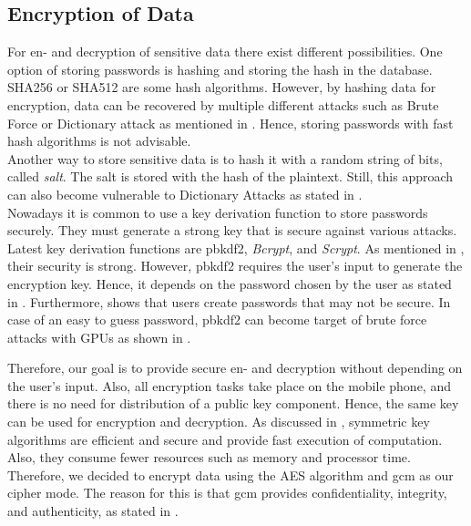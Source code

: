 \subsection{Encryption of Data}\label{arch_encryption}
For en- and decryption of sensitive data there exist different possibilities. One option of storing passwords is hashing and storing the hash in the database. SHA256 or SHA512 are some hash algorithms. However, by hashing data for encryption, data can be recovered by multiple different attacks such as Brute Force or Dictionary attack as mentioned in \cite{ertaul2016implementation}. Hence, storing passwords with fast hash algorithms is not advisable. \\
Another way to store sensitive data is to hash it with a random string of bits, called \textit{salt}. The salt is stored with the hash of the plaintext. Still, this approach can also become vulnerable to Dictionary Attacks as stated in \cite{3wrongways}. \\
Nowadays it is common to use a key derivation function to store passwords securely. They must generate a strong key that is secure against various attacks. Latest key derivation functions are \gls{pbkdf2}, \textit{Bcrypt}, and \textit{Scrypt}. As mentioned in \cite{ertaul2016implementation}, their security is strong.
However, \gls{pbkdf2} requires the user's input to generate the encryption key. Hence, it depends on the password chosen by the user as stated in \cite{Agilebits}. Furthermore, \cite{YanBAG04} shows that users create passwords that may not be secure. In case of an easy to guess password, \gls{pbkdf2} can become target of brute force attacks with GPUs as shown in \cite{DurmuthGKPYZ12}.

Therefore, our goal is to provide secure en- and decryption without depending on the user's input. Also, all encryption tasks take place on the mobile phone, and there is no need for distribution of a public key component. Hence, the same key can be used for encryption and decryption. As discussed in \cite{bala2015asymmetric}, symmetric key algorithms are efficient and secure and provide fast execution of computation. Also, they consume fewer resources such as memory and processor time. \\ Therefore, we decided to encrypt data using the AES algorithm and \gls{gcm} as our cipher mode. The reason for this is that \gls{gcm} provides confidentiality, integrity, and authenticity, as stated in \cite{AESJavaAndroid}.

